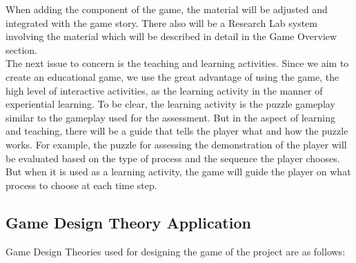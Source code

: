 \documentclass[12pt,oneside,openright,a4paper]{cpe-english-project}
\begin{document}
\begin{itemize}
%

	When adding the component of the game, the material will be adjusted and integrated with the game story. There also will be a Research Lab system involving the material which will be described in detail in the Game Overview section. \\
	The next issue to concern is the teaching and learning activities. Since we aim to create an educational game, we use the great advantage of using the game, the high level of interactive activities, as the learning activity in the manner of experiential learning. To be clear, the learning activity is the puzzle gameplay similar to the gameplay used for the assessment. But in the aspect of learning and teaching, there will be a guide that tells the player what and how the puzzle works. For example, the puzzle for assessing the demonstration of the player will be evaluated based on the type of process and the sequence the player chooses. But when it is used as a learning activity, the game will guide the player on what process to choose at each time step.

\end{itemize}

\subsection{Game Design Theory Application}
Game Design Theories used for designing the game of the project are as follows: 
\end{document}
